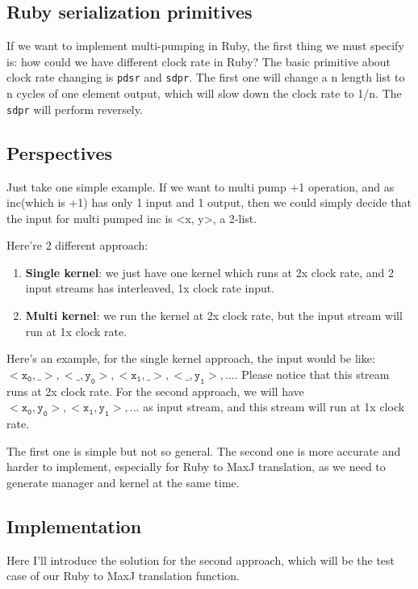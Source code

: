 \documentclass[a4paper, 10pt]{article}
\begin{document}
\subsection{Ruby serialization primitives}

If we want to implement multi-pumping in Ruby, the first thing we must specify is: how could we have different clock rate in Ruby? The basic primitive about clock rate changing is \texttt{pdsr} and \texttt{sdpr}. The first one will change a n length list to n cycles of one element output, which will slow down the clock rate to 1/n. The \texttt{sdpr} will perform reversely.

\subsection{Perspectives}

Just take one simple example. If we want to multi pump +1 operation, and as inc(which is +1) has only 1 input and 1 output, then we could simply decide that the input for multi pumped inc is <x, y>, a 2-list. 

Here're 2 different approach:
\begin{enumerate}
\item \textbf{Single kernel}: we just have one kernel which runs at 2x clock rate, and 2 input streams has interleaved, 1x clock rate input.
\item \textbf{Multi kernel}: we run the kernel at 2x clock rate, but the input stream will run at 1x clock rate.
\end{enumerate}

Here's an example, for the single kernel approach, the input would be like: $\mathtt{<x_0,\_>, <\_,y_0>,<x_1,\_>,<\_,y_1>,...}$. Please notice that this stream runs at 2x clock rate. For the second approach, we will have $\mathtt{<x_0,y_0>,<x_1,y_1>,...}$ as input stream, and this stream will run at 1x clock rate.

The first one is simple but not so general. The second one is more accurate and harder to implement, especially for Ruby to MaxJ translation, as we need to generate manager and kernel at the same time.

\subsection{Implementation}

Here I'll introduce the solution for the second approach, which will be the test case of our Ruby to MaxJ translation function.
\end{document}

